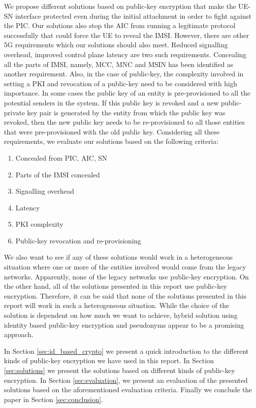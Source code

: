 \documentclass[runningheads,a4paper]{llncs} %
\begin{document}
We propose different solutions based on public-key encryption that make the UE-SN interface protected even during the initial attachment in order to fight against the PIC. Our solutions also stop the AIC from running a legitimate protocol successfully that could force the UE to reveal the IMSI. However, there are other 5G requirements which our solutions should also meet. Reduced signalling overhead, improved control plane latency are two such requirements. Concealing all the parts of IMSI, namely, MCC, MNC and MSIN has been identified as another requirement. Also, in the case of public-key, the complexity involved in setting a PKI and revocation of a public-key need to be considered with high importance. In some cases the public key of an entity is pre-provisioned to all the potential senders in the system. If this public key is revoked and a new public-private key pair is generated by the entity from which the public key was revoked, then the new public key needs to be re-provisioned to all those entities that were pre-provisioned with the old public key. Considering all these requirements, we evaluate our solutions based on the following criteria:
\begin{enumerate}
\item Concealed from PIC, AIC, SN
\item Parts of the IMSI concealed
\item Signalling overhead
\item Latency
\item PKI complexity
\item Public-key revocation and re-provisioning 
\end{enumerate}

We also want to see if any of these solutions would work in a heterogeneous situation where one or more of the entities involved would come from the legacy networks. Apparently, none of the legacy networks use public-key encryption. On the other hand, all of the solutions presented in this report use public-key encryption. Therefore, it can be said that none of the solutions presented in this report will work in such a heterogeneous situation. While the choice of the solution is dependent on how much we want to achieve, hybrid solution using identity based public-key encryption and pseudonyms appear to be a promising approach.

In Section \ref{sec:id_based_crypto} we present a quick introduction to the different kinds of public-key encryption we have used in this report. In Section \ref{sec:solutions} we present the solutions based on different kinds of public-key encryption. In Section \ref{sec:evaluation}, we present an evaluation of the presented solutions based on the aforementioned evaluation criteria. Finally we conclude the paper in Section \ref{sec:conclusion}.
\end{document}
